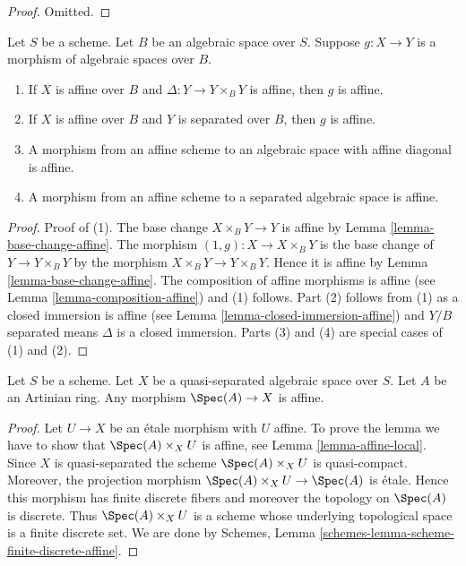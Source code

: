 \begin{proof}
Omitted.
\end{proof}

\begin{lemma}
\label{lemma-affine-permanence}
Let $S$ be a scheme. Let $B$ be an algebraic space over $S$.
Suppose $g : X \to Y$ is a morphism of algebraic spaces over $B$.
\begin{enumerate}
\item If $X$ is affine over $B$ and $\Delta : Y \to Y \times_B Y$ is affine,
then $g$ is affine.
\item If $X$ is affine over $B$ and $Y$ is separated over $B$,
then $g$ is affine.
\item A morphism from an affine scheme to an algebraic space with affine
diagonal is affine.
\item A morphism from an affine scheme to a separated algebraic space
is affine.
\end{enumerate}
\end{lemma}

\begin{proof}
Proof of (1). The base change $X \times_B Y \to Y$ is affine by
Lemma \ref{lemma-base-change-affine}.
The morphism $(1, g) : X \to X \times_B Y$ is the base change of
$Y \to Y \times_B Y$ by the morphism $X \times_B Y \to Y \times_B Y$.
Hence it is affine by
Lemma \ref{lemma-base-change-affine}.
The composition of affine morphisms is affine
(see Lemma \ref{lemma-composition-affine}) and (1) follows.
Part (2) follows from (1) as a closed immersion is affine
(see Lemma \ref{lemma-closed-immersion-affine}) and $Y/B$ separated
means $\Delta$ is a closed immersion. Parts (3) and (4) are special
cases of (1) and (2).
\end{proof}

\begin{lemma}
\label{lemma-Artinian-affine}
Let $S$ be a scheme. Let $X$ be a quasi-separated algebraic space over $S$.
Let $A$ be an Artinian ring. Any morphism $\Spec(A) \to X$ is affine.
\end{lemma}

\begin{proof}
Let $U \to X$ be an \'etale morphism with $U$ affine. To prove the
lemma we have to show that $\Spec(A) \times_X U$ is affine, see
Lemma \ref{lemma-affine-local}. Since $X$ is quasi-separated the
scheme $\Spec(A) \times_X U$ is quasi-compact. Moreover, the
projection morphism $\Spec(A) \times_X U \to \Spec(A)$ is \'etale.
Hence this morphism has finite discrete fibers and moreover
the topology on $\Spec(A)$ is discrete. Thus $\Spec(A) \times_X U$
is a scheme whose underlying topological
space is a finite discrete set. We are done by
Schemes, Lemma \ref{schemes-lemma-scheme-finite-discrete-affine}.
\end{proof}












